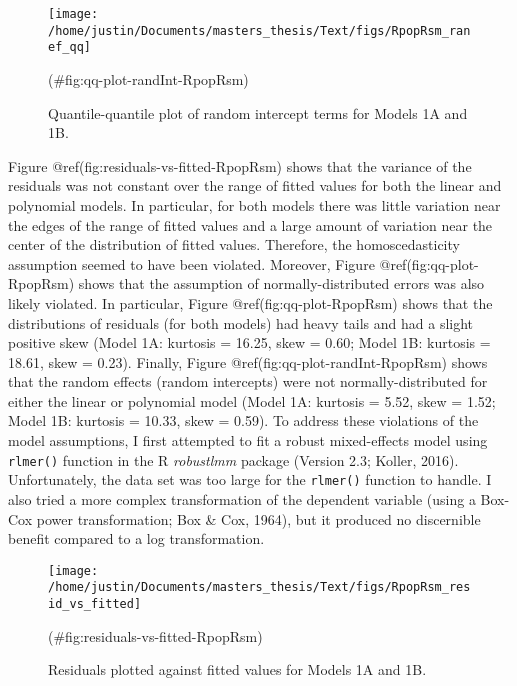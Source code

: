 \begin{appendix}
\begin{figure}

{\centering \texttt{[image: /home/justin/Documents/masters\_thesis/Text/figs/RpopRsm\_ranef\_qq]} 

}

\caption{Quantile-quantile plot of random intercept terms for Models 1A and 1B.}(\#fig:qq-plot-randInt-RpopRsm)
\end{figure}

Figure @ref(fig:residuals-vs-fitted-RpopRsm) shows that the variance of
the residuals was not constant over the range of fitted values for both
the linear and polynomial models. In particular, for both models there
was little variation near the edges of the range of fitted values and a
large amount of variation near the center of the distribution of fitted
values. Therefore, the homoscedasticity assumption seemed to have been
violated. Moreover, Figure @ref(fig:qq-plot-RpopRsm) shows that the
assumption of normally-distributed errors was also likely violated. In
particular, Figure @ref(fig:qq-plot-RpopRsm) shows that the
distributions of residuals (for both models) had heavy tails and had a
slight positive skew (Model 1A: kurtosis = 16.25, skew = 0.60; Model 1B:
kurtosis = 18.61, skew = 0.23). Finally, Figure
@ref(fig:qq-plot-randInt-RpopRsm) shows that the random effects (random
intercepts) were not normally-distributed for either the linear or
polynomial model (Model 1A: kurtosis = 5.52, skew = 1.52; Model 1B:
kurtosis = 10.33, skew = 0.59). To address these violations of the model
assumptions, I first attempted to fit a robust mixed-effects model using
\texttt{rlmer()} function in the R \emph{robustlmm} package (Version
2.3; Koller, 2016). Unfortunately, the data set was too large for the
\texttt{rlmer()} function to handle. I also tried a more complex
transformation of the dependent variable (using a Box-Cox power
transformation; Box \& Cox, 1964), but it produced no discernible
benefit compared to a log transformation.

\begin{figure}

{\centering \texttt{[image: /home/justin/Documents/masters\_thesis/Text/figs/RpopRsm\_resid\_vs\_fitted]} 

}

\caption{Residuals plotted against fitted values for Models 1A and 1B.}(\#fig:residuals-vs-fitted-RpopRsm)
\end{figure}


\end{appendix}
